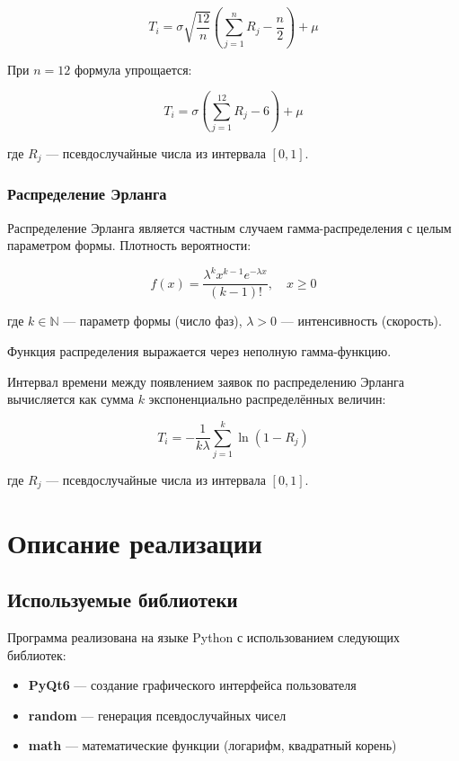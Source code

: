 \begin{equation}
T_i = \sigma\sqrt{\frac{12}{n}}\left(\sum_{j=1}^{n}R_j - \frac{n}{2}\right) + \mu
\end{equation}

При $n=12$ формула упрощается:

\begin{equation}
T_i = \sigma\left(\sum_{j=1}^{12}R_j - 6\right) + \mu
\end{equation}

где $R_j$ — псевдослучайные числа из интервала $[0, 1]$.

\subsubsection{Распределение Эрланга}

Распределение Эрланга является частным случаем гамма-распределения с целым параметром формы. Плотность вероятности:

\begin{equation}
f(x) = \frac{\lambda^k x^{k-1} e^{-\lambda x}}{(k-1)!}, \quad x \geq 0
\end{equation}

где $k \in \mathbb{N}$ — параметр формы (число фаз), $\lambda > 0$ — интенсивность (скорость).

Функция распределения выражается через неполную гамма-функцию.

Интервал времени между появлением заявок по распределению Эрланга вычисляется как сумма $k$ экспоненциально распределённых величин:

\begin{equation}
T_i = -\frac{1}{k\lambda}\sum_{j=1}^{k}\ln(1 - R_j)
\end{equation}

где $R_j$ — псевдослучайные числа из интервала $[0, 1]$.

\section{Описание реализации}

\subsection{Используемые библиотеки}

Программа реализована на языке Python с использованием следующих библиотек:

\begin{itemize}
    \item \textbf{PyQt6} — создание графического интерфейса пользователя
    \item \textbf{random} — генерация псевдослучайных чисел
    \item \textbf{math} — математические функции (логарифм, квадратный корень)
\end{itemize}


